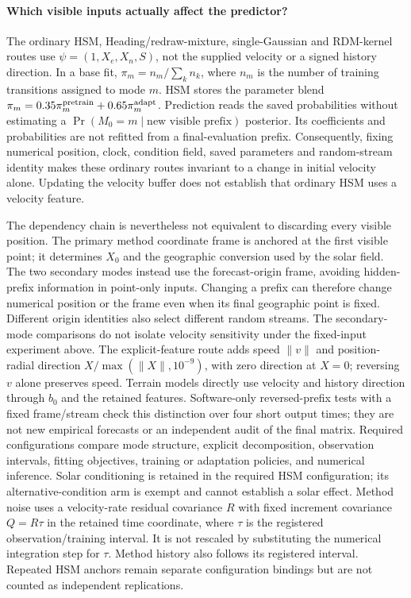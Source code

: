 \paragraph{Which visible inputs actually affect the predictor?}
The ordinary HSM, Heading/redraw-mixture, single-Gaussian and RDM-kernel routes
use \(\psi=(1,X_e,X_n,S)\), not the supplied velocity or a signed history
direction. In a base fit, \(\pi_m=n_m/\sum_k n_k\), where \(n_m\) is the
number of training transitions assigned to mode \(m\).
HSM stores the parameter blend
\(\pi_m=0.35\pi_m^{\rm pretrain}+0.65\pi_m^{\rm adapt}\).
Prediction reads the saved probabilities without estimating a
\(\Pr(M_0=m\mid\text{new visible prefix})\) posterior. Its coefficients and
probabilities are not refitted from a final-evaluation prefix.
Consequently, fixing numerical position, clock, condition field, saved
parameters and random-stream identity makes these ordinary routes invariant
to a change in initial velocity alone. Updating the velocity buffer does
not establish that ordinary HSM uses a velocity feature.

The dependency chain is nevertheless not equivalent to discarding every
visible position. The primary method coordinate frame is anchored at the
first visible point; it determines \(X_0\) and the geographic conversion
used by the solar field. The two secondary modes instead use the
forecast-origin frame, avoiding hidden-prefix information in point-only
inputs. Changing a prefix can therefore change numerical position or the
frame even when its final geographic point is fixed. Different origin
identities also select different random streams. The secondary-mode
comparisons do not isolate velocity sensitivity under the fixed-input
experiment above. The explicit-feature route adds speed
\(\|v\|\) and position-radial direction
\(X/\max(\|X\|,10^{-9})\), with zero direction at \(X=0\);
reversing \(v\) alone preserves speed. Terrain models directly use
velocity and history direction through \(b_0\) and the retained features.
Software-only reversed-prefix tests with a fixed frame/stream check this
distinction over four short output times; they are not new empirical
forecasts or an independent audit of the final matrix.
Required configurations compare mode structure, explicit decomposition, observation
intervals, fitting objectives, training or adaptation policies, and numerical
inference. Solar conditioning is retained in the required HSM configuration;
its alternative-condition arm is exempt and cannot establish a solar effect.
Method noise uses a velocity-rate residual
covariance \(R\) with fixed increment covariance \(Q=R\tau\) in the retained time coordinate, where
\(\tau\) is the registered observation/training interval. It is not rescaled
by substituting the numerical integration step for \(\tau\). Method history
also follows its registered interval. Repeated HSM anchors remain separate
configuration bindings but are not counted as independent replications.

